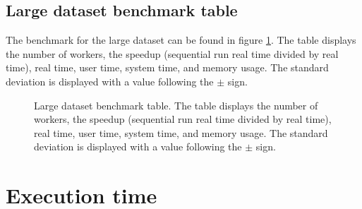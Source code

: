 \subsection{Large dataset benchmark table}
The benchmark for the large dataset can be found in figure \ref{fig:dataset_4_table}.
The table displays the number of workers, the speedup (sequential run real time divided by real time), real time,
user time, system time, and memory usage. The standard deviation is displayed with a value following the $\pm$ sign.

\begin{figure}[ht]
\centering
{}
\caption[Large dataset benchmark table.]{Large dataset benchmark table. The table displays the number of workers, the speedup (sequential run real time divided by real time), real time,
user time, system time, and memory usage. The standard deviation is displayed with a value following the $\pm$ sign.}
\label{fig:dataset_4_table}
\end{figure}

\section{Execution time}

